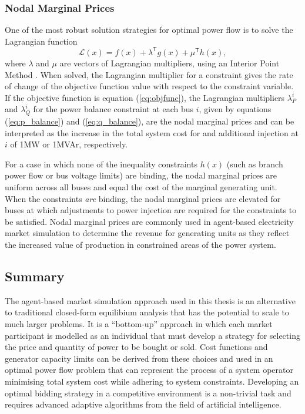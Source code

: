 \subsubsection{Nodal Marginal Prices}
One of the most robust solution strategies for optimal power flow is to solve
the Lagrangian function
\begin{equation}
\mathcal{L}(x) = f(x) + \lambda^\mathsf{T}g(x) + \mu^\mathsf{T}h(x),
\end{equation}
where $\lambda$ and $\mu$ are vectors of Lagrangian multipliers, using an
Interior Point Method \cite{cvxopt:2004}.  When solved, the Lagrangian
multiplier for a constraint gives the rate of change of the objective function
value with respect to the constraint variable.  If the objective function is
equation (\ref{eq:objfunc}), the Lagrangian multipliers $\lambda^i_P$ and
$\lambda^i_Q$ for the power balance constraint at each bus $i$, given by
equations (\ref{eq:p_balance}) and (\ref{eq:q_balance}), are the nodal marginal
prices and can be interpreted as the increase in the total system cost for and
additional injection at $i$ of 1MW or 1MVAr, respectively.

For a case in which none of the inequality constraints $h(x)$
(such as branch power flow or bus voltage limits) are binding, the nodal
marginal prices are uniform across all buses and equal the cost of the
marginal generating unit.  When the constraints \textit{are} binding, the nodal
marginal prices are elevated for buses at which adjustments to power injection
are required for the constraints to be satisfied.  Nodal marginal prices are
commonly used in agent-based electricity market simulation to determine the
revenue for generating units as they reflect the increased value of production
in constrained areas of the power system.

\subsection{Summary}
The agent-based market simulation approach used in this thesis is an alternative
to traditional closed-form equilibium analysis that has the potential to scale
to much larger problems. It is a ``bottom-up'' approach in which each market
participant is modelled as an individual that must develop a strategy for
selecting the price and quantity of power to be bought or sold.  Cost functions
and generator capacity limits can be derived from these choices and used in an
optimal power flow problem that can represent the process of a system operator
minimising total system cost while adhering to system constraints.
Developing an optimal bidding strategy in a competitive environment is a
non-trivial task and requires advanced adaptive algorithms from the field of
artificial intelligence.

